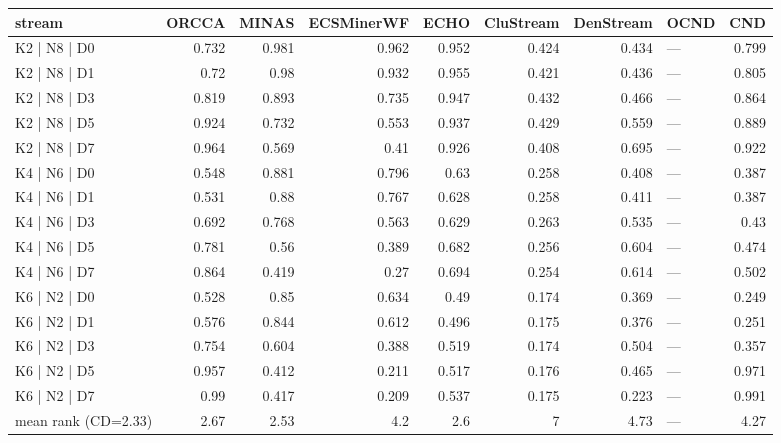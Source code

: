 \begin{tabular}{lrrrrrrlr}
\hline
 stream              &   ORCCA &   MINAS &   ECSMinerWF &   ECHO &   CluStream &   DenStream & OCND   &   CND \\
\hline
 K2 | N8 | D0        &   0.732 &   0.981 &        0.962 &  0.952 &       0.424 &       0.434 & ---    & 0.799 \\
 K2 | N8 | D1        &   0.72  &   0.98  &        0.932 &  0.955 &       0.421 &       0.436 & ---    & 0.805 \\
 K2 | N8 | D3        &   0.819 &   0.893 &        0.735 &  0.947 &       0.432 &       0.466 & ---    & 0.864 \\
 K2 | N8 | D5        &   0.924 &   0.732 &        0.553 &  0.937 &       0.429 &       0.559 & ---    & 0.889 \\
 K2 | N8 | D7        &   0.964 &   0.569 &        0.41  &  0.926 &       0.408 &       0.695 & ---    & 0.922 \\
 K4 | N6 | D0        &   0.548 &   0.881 &        0.796 &  0.63  &       0.258 &       0.408 & ---    & 0.387 \\
 K4 | N6 | D1        &   0.531 &   0.88  &        0.767 &  0.628 &       0.258 &       0.411 & ---    & 0.387 \\
 K4 | N6 | D3        &   0.692 &   0.768 &        0.563 &  0.629 &       0.263 &       0.535 & ---    & 0.43  \\
 K4 | N6 | D5        &   0.781 &   0.56  &        0.389 &  0.682 &       0.256 &       0.604 & ---    & 0.474 \\
 K4 | N6 | D7        &   0.864 &   0.419 &        0.27  &  0.694 &       0.254 &       0.614 & ---    & 0.502 \\
 K6 | N2 | D0        &   0.528 &   0.85  &        0.634 &  0.49  &       0.174 &       0.369 & ---    & 0.249 \\
 K6 | N2 | D1        &   0.576 &   0.844 &        0.612 &  0.496 &       0.175 &       0.376 & ---    & 0.251 \\
 K6 | N2 | D3        &   0.754 &   0.604 &        0.388 &  0.519 &       0.174 &       0.504 & ---    & 0.357 \\
 K6 | N2 | D5        &   0.957 &   0.412 &        0.211 &  0.517 &       0.176 &       0.465 & ---    & 0.971 \\
 K6 | N2 | D7        &   0.99  &   0.417 &        0.209 &  0.537 &       0.175 &       0.223 & ---    & 0.991 \\
 mean rank (CD=2.33) &   2.67  &   2.53  &        4.2   &  2.6   &       7     &       4.73  & ---    & 4.27  \\
\hline
\end{tabular}
